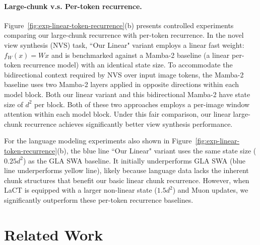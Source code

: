 \documentclass{article}
\begin{document}
\paragraph{Large-chunk v.s. Per-token recurrence.} 
Figure~\ref{fig:exp-linear-token-recurrence}(b) presents controlled experiments comparing our large-chunk recurrence with per-token recurrence. 
In the novel view synthesis (NVS) task, ``Our Linear" variant employs a linear fast weight: $f_W(x) = Wx$ and is benchmarked against a Mamba-2 baseline (a linear per-token recurrence model) with an identical state size. To accommodate the bidirectional context required by NVS over input image tokens, the Mamba-2 baseline uses two Mamba-2 layers applied in opposite directions within each model block. Both our linear variant and this bidirectional Mamba-2 have state size of $d^2$ per block. Both of these two approaches employs a per-image window attention within each model block. Under this fair comparison, our linear large-chunk recurrence achieves significantly better view synthesis performance.

For the language modeling experiments also shown in Figure~\ref{fig:exp-linear-token-recurrence}(b), the blue line ``Our Linear" variant uses the same state size ($0.25 d^2$) as the GLA SWA baseline. It initially underperforms GLA SWA (blue line underperforms yellow line),  likely because language data lacks the inherent chunk structures that benefit our basic linear chunk recurrence. However, when LaCT is equipped with a larger non-linear state ($1.5d^2$) and Muon updates, we significantly outperform these per-token recurrence baselines.

\section{Related Work}
\label{appendix_sec:realted_work}
\end{document}
